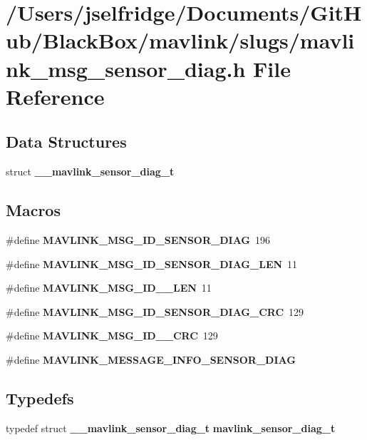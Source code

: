 \section{/\+Users/jselfridge/\+Documents/\+Git\+Hub/\+Black\+Box/mavlink/slugs/mavlink\+\_\+msg\+\_\+sensor\+\_\+diag.h File Reference}
\label{mavlink__msg__sensor__diag_8h}
\subsection*{Data Structures}
\begin{DoxyCompactItemize}
\item 
struct \textbf{ \+\_\+\+\_\+mavlink\+\_\+sensor\+\_\+diag\+\_\+t}
\end{DoxyCompactItemize}
\subsection*{Macros}
\begin{DoxyCompactItemize}
\item 
\#define \textbf{ M\+A\+V\+L\+I\+N\+K\+\_\+\+M\+S\+G\+\_\+\+I\+D\+\_\+\+S\+E\+N\+S\+O\+R\+\_\+\+D\+I\+AG}~196
\item 
\#define \textbf{ M\+A\+V\+L\+I\+N\+K\+\_\+\+M\+S\+G\+\_\+\+I\+D\+\_\+\+S\+E\+N\+S\+O\+R\+\_\+\+D\+I\+A\+G\+\_\+\+L\+EN}~11
\item 
\#define \textbf{ M\+A\+V\+L\+I\+N\+K\+\_\+\+M\+S\+G\+\_\+\+I\+D\+\_\+\_\+\+L\+EN}~11
\item 
\#define \textbf{ M\+A\+V\+L\+I\+N\+K\+\_\+\+M\+S\+G\+\_\+\+I\+D\+\_\+\+S\+E\+N\+S\+O\+R\+\_\+\+D\+I\+A\+G\+\_\+\+C\+RC}~129
\item 
\#define \textbf{ M\+A\+V\+L\+I\+N\+K\+\_\+\+M\+S\+G\+\_\+\+I\+D\+\_\+\_\+\+C\+RC}~129
\item 
\#define \textbf{ M\+A\+V\+L\+I\+N\+K\+\_\+\+M\+E\+S\+S\+A\+G\+E\+\_\+\+I\+N\+F\+O\+\_\+\+S\+E\+N\+S\+O\+R\+\_\+\+D\+I\+AG}
\end{DoxyCompactItemize}
\subsection*{Typedefs}
\begin{DoxyCompactItemize}
\item 
typedef struct \textbf{ \+\_\+\+\_\+mavlink\+\_\+sensor\+\_\+diag\+\_\+t} \textbf{ mavlink\+\_\+sensor\+\_\+diag\+\_\+t}
\end{DoxyCompactItemize}


